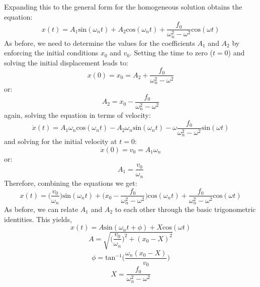 \documentclass[12pt,letter]{article}
\numberwithin{ex}{section} %
\numberwithin{re}{section} %
\begin{document}
			Expanding this to the general form for the homogeneous solution obtains the equation:
			\begin{equation}
				x(t) = A_1\text{sin}(\omega_n t) + A_2\text{cos}(\omega_n t) + \frac{f_0}{\omega_n^2-\omega^2}\text{cos}(\omega t)
			\end{equation}				
			As before, we need to determine the values for the coefficients $A_1$ and $A_2$ by enforcing the initial conditions $x_0$ and $v_0$. Setting the time to zero ($t=0$) and solving the initial displacement leads to:
			\begin{equation}
				x(0) = x_0 = A_2 + \frac{f_0}{\omega_n^2-\omega^2}
			\end{equation}				
			or:
			\begin{equation}
				A_2 = x_0-\frac{f_0}{\omega_n^2-\omega^2}
			\end{equation}	
			again, solving the equation in terms of velocity:
			\begin{equation}
				\dot{x}(t) = A_1\omega_n\text{cos}(\omega_n t) - A_2 \omega_n \text{sin}(\omega_n t) - \omega \frac{f_0}{\omega_n^2-\omega^2}\text{sin}(\omega t)
			\end{equation}	
			and solving for the initial velocity at $t=0$:
			\begin{equation}
				\dot{x}(0) = v_0 =  A_1 \omega_n
			\end{equation}				
			or:
			\begin{equation}
				A_1 = \frac{v_0}{\omega_n}
			\end{equation}				
			Therefore, combining the equations we get:
			\begin{equation}
				x(t) = \Big(\frac{v_0}{\omega_n}\Big)\text{sin}(\omega_n t) + \Big(x_0-\frac{f_0}{\omega_n^2-\omega^2}\Big)\text{cos}(\omega_n t) + \frac{f_0}{\omega_n^2-\omega^2}\text{cos}(\omega t)
			\end{equation}	
			As before, we can relate $A_1$ and $A_2$ to each other through the basic trigonometric identities. This yields, 
			\begin{equation}
				x(t) = A\text{sin}(\omega_n t + \phi) + X\text{cos}(\omega t) 
			\end{equation}				
			\begin{equation}
				A = \sqrt{\bigg(\frac{v_0}{\omega_n}\bigg)^2+(x_0-X)^2}
			\end{equation}				
			\begin{equation}
				\phi = \text{tan}^{-1}\bigg(\frac{\omega_n(x_0-X)}{v_0}\bigg)
			\end{equation}				
			\begin{equation}
				X = \frac{f_0}{\omega_n^2-\omega^2}
			\end{equation}				
			
\end{document}
